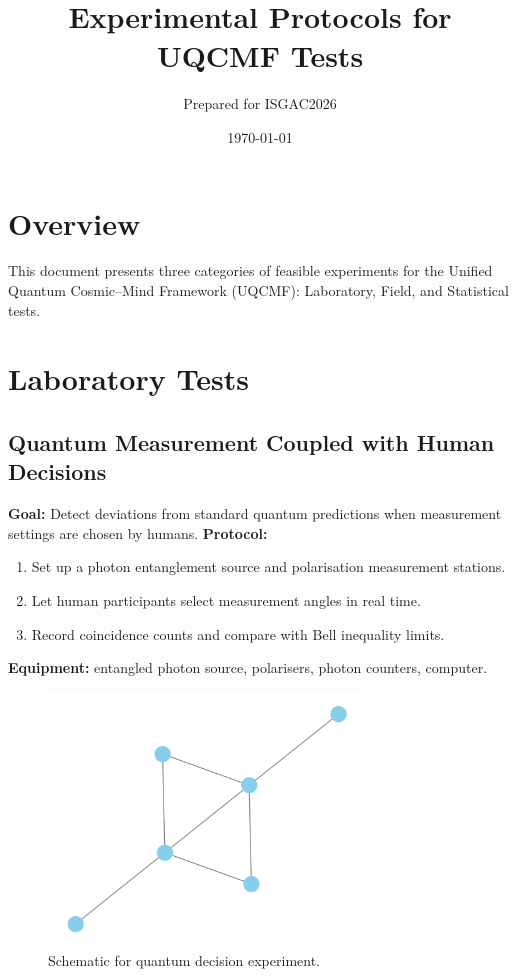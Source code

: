 \documentclass[11pt,a4paper]{article}
\title{Experimental Protocols for UQCMF Tests}
\author{Prepared for ISGAC2026}
\date{\today}
\begin{document}
\maketitle

\section*{Overview}
This document presents three categories of feasible experiments for the Unified Quantum Cosmic--Mind Framework (UQCMF): Laboratory, Field, and Statistical tests.

\section{Laboratory Tests}
\subsection{Quantum Measurement Coupled with Human Decisions}
\textbf{Goal:} Detect deviations from standard quantum predictions when measurement settings are chosen by humans.
\textbf{Protocol:}
\begin{enumerate}
  \item Set up a photon entanglement source and polarisation measurement stations.
  \item Let human participants select measurement angles in real time.
  \item Record coincidence counts and compare with Bell inequality limits.
\end{enumerate}
\textbf{Equipment:} entangled photon source, polarisers, photon counters, computer.
\begin{figure}[h]
    \centering
    \includegraphics[width=0.75\textwidth]{figures/lab1_schematic.png}
    \caption{Schematic for quantum decision experiment.}
\end{figure}
\end{document}
